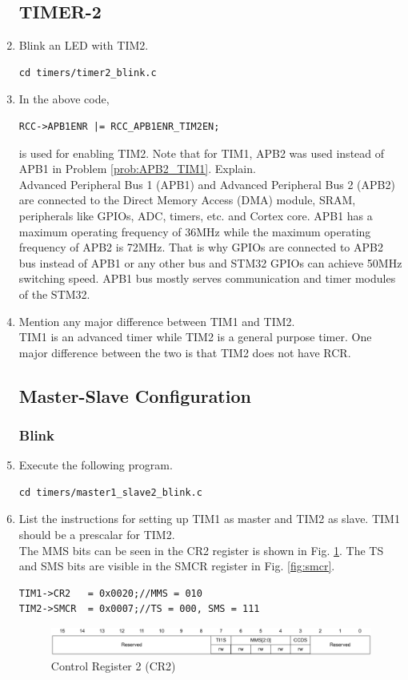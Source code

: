 \documentclass[journal,12pt,twocolumn]{IEEEtran}
\renewcommand\thesection{\arabic{section}}
\renewcommand\thesubsection{\thesection.\arabic{subsection}}
\begin{document}
\begin{enumerate}[label=\thesubsection.\arabic*.,ref=\thesubsection.\theenumi]
\subsection{TIMER-2}
\item Blink an LED with TIM2.
\\
\solution 
\begin{lstlisting}
cd timers/timer2_blink.c
\end{lstlisting}
\item In the above code, 
\begin{lstlisting}
RCC->APB1ENR |= RCC_APB1ENR_TIM2EN;
\end{lstlisting}
is used for enabling TIM2. Note that for TIM1, APB2 was used instead of APB1 in Problem \ref{prob:APB2_TIM1}.  Explain.
\\
\solution Advanced Peripheral Bus 1 (APB1) and Advanced Peripheral Bus 2 (APB2) are connected to the Direct Memory Access (DMA) module, SRAM, peripherals like GPIOs, ADC, timers, etc. and Cortex core. APB1 has a maximum operating frequency of 36MHz while the maximum operating frequency of APB2  is 72MHz. That is why GPIOs are connected to APB2 bus instead of APB1 or any other bus and STM32 GPIOs can achieve 50MHz switching speed. APB1 bus mostly serves communication and timer modules of the STM32. 
\item Mention any major difference between TIM1 and TIM2.
\\
\solution TIM1 is an advanced timer while TIM2 is a general purpose timer.  One major difference between the two is that TIM2 does not have RCR.
\subsection{Master-Slave Configuration}
\subsubsection{Blink}
\item Execute the following program.
\begin{lstlisting}
cd timers/master1_slave2_blink.c
\end{lstlisting}
\item List the instructions for setting up TIM1 as master and TIM2 as slave. TIM1 should be a prescalar for TIM2.
\\
\solution The MMS bits can be seen in the CR2 register is shown in Fig. \ref{fig:cr2}. The TS and SMS bits are visible in the SMCR register
in Fig. \ref{fig:smcr}. 
\begin{lstlisting}
TIM1->CR2	= 0x0020;//MMS = 010
TIM2->SMCR	= 0x0007;//TS = 000, SMS = 111	
\end{lstlisting}
%
\begin{figure}[!h]
\begin{center}
\includegraphics[width=\columnwidth]{./stm32/timers/figs/cr2.eps}
\end{center}
\caption{Control Register 2 (CR2)}
\label{fig:cr2}
\end{figure}
%

\end{enumerate}
\end{document}
